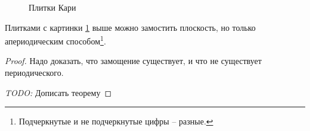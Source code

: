 \begin{figure}[ht]
    \centering
    \caption{Плитки Кари}
    \label{fig:kari-tiles}
\end{figure}
\begin{thm}
    Плитками с картинки \ref{fig:kari-tiles} выше можно замостить плоскость, но только апериодическим способом\footnote{Подчеркнутые и не подчеркнутые цифры -- разные.}.
\end{thm}
\begin{proof}
    Надо доказать, что замощение существует, и что не существует периодического.
	
    \textit{TODO:} Дописать теорему
\end{proof}
